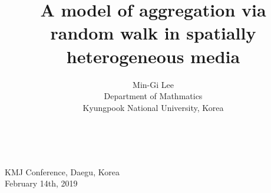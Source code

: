 \documentclass{beamer}
\begin{document}
\title[Random walk in spatially heterogeneous media ]{\LARGE A model of aggregation via \\ random walk in spatially heterogeneous media }
\author{\vskip 5pt \small {Min-Gi Lee}\\ \vskip 5pt \scriptsize Department of Mathmatics\\Kyungpook National University, Korea\\}
\date{~}
\begin{frame}
  \titlepage
  \vskip -60pt
  \center
  {\small
  {\scriptsize KMJ Conference, Daegu, Korea}\\
  {\scriptsize February 14th, 2019}\\}
\end{frame}
% 
% 
% 
\end{document}
